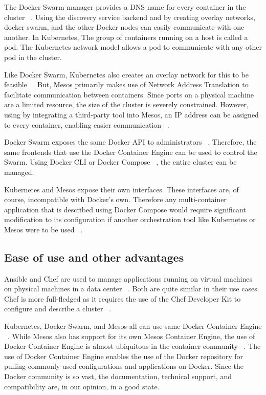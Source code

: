 \documentclass[10pt,twocolumn]{article}
\begin{document}
The Docker Swarm manager provides a DNS name for every container in the cluster ~\cite{intro_docker}.
Using the discovery service backend and by creating overlay networks, docker swarm, and the other Docker nodes can easily communicate with one another.
In Kubernetes, The group of containers running on a host is called a pod.
The Kubernetes network model allows a pod to communicate with any other pod in the cluster.

Like Docker Swarm, Kubernetes also creates an overlay network for this to be feasible ~\cite{platform9_dockerswarm_kubernetes}.
But, Mesos primarily makes use of Network Address Translation to facilitate communication between containers.
Since ports on a physical machine are a limited resource, the size of the cluster is severely constrained.
However, using by integrating a third-party tool into Mesos, an IP address can be assigned to every container, enabling easier communication ~\cite{platform9_mesos_kubernetes}.

Docker Swarm exposes the same Docker API to administrators ~\cite{docker_swarm}.
Therefore, the same frontends that use the Docker Container Engine can be used to control the Swarm.
Using Docker CLI or Docker Compose ~\cite{docker_compose}, the entire cluster can be managed.

Kubernetes and Mesos expose their own interfaces.
These interfaces are, of course, incompatible with Docker's own.
Therefore any multi-container application that is described using Docker Compose would require significant modification to its configuration if another orchestration tool like Kubernetes or Mesos were to be used ~\cite{kubernetes, mesos}.

\subsection{Ease of use and other advantages}

Ansible and Chef are used to manage applications running on virtual machines on physical machines in a data center ~\cite{ansible, chef}.
Both are quite similar in their use cases.
Chef is more full-fledged as it requires the use of the Chef Developer Kit to configure and describe a cluster ~\cite{chef}.

Kubernetes, Docker Swarm, and Mesos all can use same Docker Container Engine ~\cite{kubernetes, docker_swarm, mesos}.
While Mesos also has support for its own Mesos Container Engine, the use of Docker Container Engine is almost ubiquitous in the container community ~\cite{intro_docker}.
The use of Docker Container Engine enables the use of the Docker repository for pulling commonly used configurations and applications on Docker.
Since the Docker community is so vast, the documentation, technical support, and compatibility are, in our opinion, in a good state.
\end{document}
